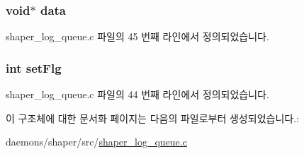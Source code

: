 \subsubsection[{\texorpdfstring{data}{data}}]{\setlength{\rightskip}{0pt plus 5cm}void$\ast$ data}\hypertarget{structshaper__log__queue__elem_a735984d41155bc1032e09bece8f8d66d}{}\label{structshaper__log__queue__elem_a735984d41155bc1032e09bece8f8d66d}


shaper\+\_\+log\+\_\+queue.\+c 파일의 45 번째 라인에서 정의되었습니다.

\subsubsection[{\texorpdfstring{set\+Flg}{setFlg}}]{\setlength{\rightskip}{0pt plus 5cm}int set\+Flg}\hypertarget{structshaper__log__queue__elem_aa457306deb1979d52675b298626b010b}{}\label{structshaper__log__queue__elem_aa457306deb1979d52675b298626b010b}


shaper\+\_\+log\+\_\+queue.\+c 파일의 44 번째 라인에서 정의되었습니다.



이 구조체에 대한 문서화 페이지는 다음의 파일로부터 생성되었습니다.\+:\begin{DoxyCompactItemize}
\item 
daemons/shaper/src/\hyperlink{shaper__log__queue_8c}{shaper\+\_\+log\+\_\+queue.\+c}\end{DoxyCompactItemize}
